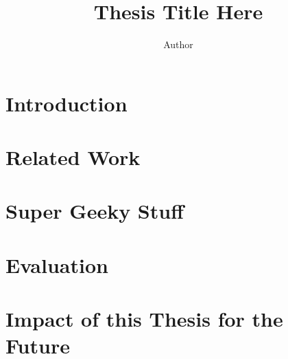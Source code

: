 \documentclass[12pt,final,oneside]{memoir}
\title{Thesis Title Here}
\author{Author}
\begin{document}
\frontmatter

\makeccsthesistitle

% 



\cleardoublepage
\cleardoublepage

\cleardoublepage
\tableofcontents
\cleardoublepage
\listoffigures

%
%
%


\mainmatter
\chapter{Introduction}
\label{ch:overview}


\chapter{Related Work}
\label{sec:relatedWork}


\chapter{Super Geeky Stuff}
\label{ch:core}


\chapter{Evaluation}
\label{sec:evaluation}


\chapter{Impact of this Thesis for the Future}

\end{document}
